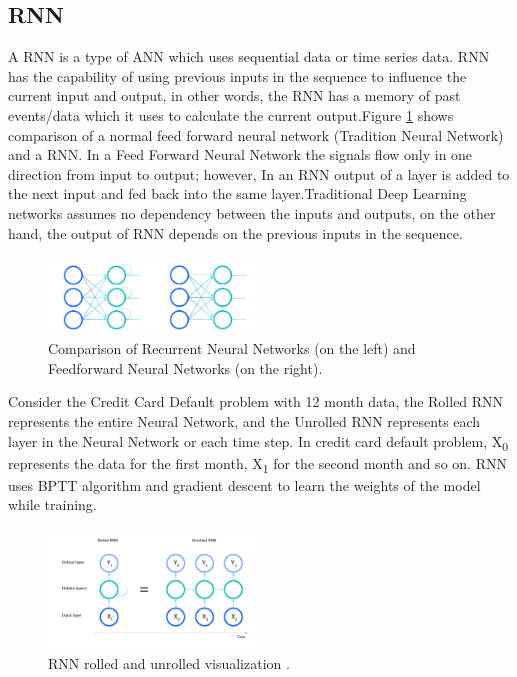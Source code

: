 \documentclass[twoside,11pt,a4paper]{article}
\begin{document}
\subsection{\acf{RNN}}
A \acf{RNN} is a type of \acs{ANN} which uses sequential data or time series data. \acs{RNN} has the capability of using previous inputs in the sequence to influence the current input and output, in other words, the \acs{RNN} has a memory of past events/data which it uses to calculate the current output.Figure \ref{fig:rnn_nn} shows comparison of a normal feed forward neural network (Tradition Neural Network)  and a \acs{RNN}. In a Feed Forward Neural Network the signals flow only in one direction from input to output; however, In an \acs{RNN} output of a layer is added to the next input and fed back into the same layer.Traditional Deep Learning networks assumes no dependency between the inputs and outputs, on the other hand, the output of \acs{RNN} depends on the previous inputs in the sequence.\\
\begin{figure}[ht]
	\centering
	\includegraphics[width=0.5\textwidth]{rnn_nn}
	\caption[Comparison of Recurrent Neural Networks (on the left) and Feedforward Neural Networks (on the right)]{Comparison of Recurrent Neural Networks (on the left) and Feedforward Neural Networks (on the right)\citep{ibm2022rnn}.}
	\label{fig:rnn_nn}
\end{figure}
\FloatBarrier
Consider the Credit Card Default problem with 12 month data, the Rolled \acs{RNN} represents the entire Neural Network, and the Unrolled \acs{RNN} represents each layer in the Neural Network or each time step. In credit card default problem, X\textsubscript{0}  represents the data for the first month, X\textsubscript{1} for the second month and so on. \acs{RNN} uses \acf{BPTT} algorithm and gradient descent to learn the weights of the model while training.\\
\begin{figure}[ht]
	\centering
	\includegraphics[width=0.5\textwidth]{rnn_rolled_unrolled}
	\caption[\acs{RNN} rolled and unrolled visualization]{\acs{RNN} rolled and unrolled visualization \citep{ibm2022rnn}.}
	\label{fig:rnn_rolled_unrolled}
\end{figure}
\end{document}
